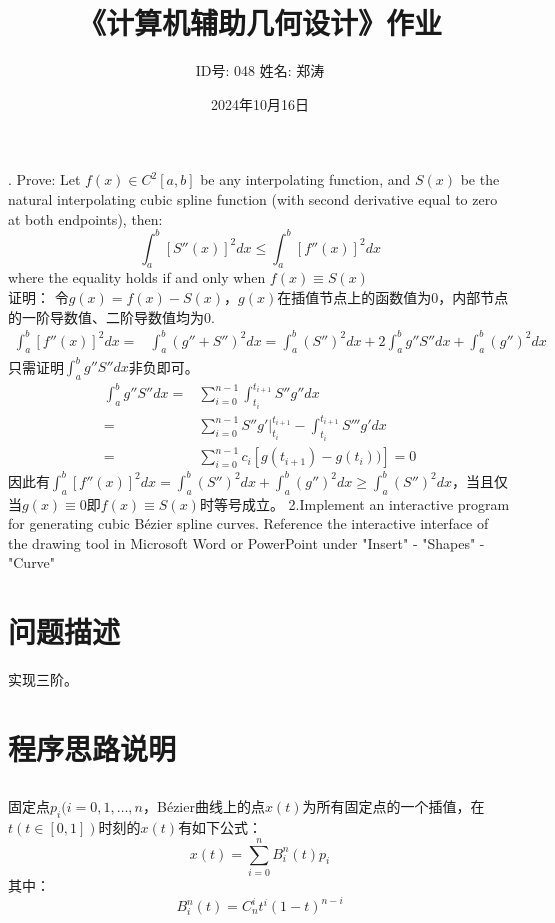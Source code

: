 \documentclass{article}
\newcommand{\Bezier}{B\'ezier}%
\begin{document}
	
	\title{《计算机辅助几何设计》作业}
	\author{ID号: 048  \qquad  姓名: 郑涛}  %
	\date{2024年10月16日}
	\maketitle
	
	. Prove: Let $f(x) \in C^2[a,b]$ be any interpolating function, and $S(x)$ be the natural 
	interpolating cubic spline function (with second derivative equal to zero at both endpoints), then:
	$$\int_{a}^{b}[S''(x)]^2dx\leq\int_{a}^{b}[f''(x)]^2dx$$
	where the equality holds if and only when $f(x) \equiv S(x)$\\
	证明：
	令$g(x)=f(x)-S(x)$，$g(x)$在插值节点上的函数值为0，内部节点的一阶导数值、二阶导数值均为0.
	\begin{equation*}
		\begin{aligned}
			\int_{a}^{b}[f''(x)]^2dx=&\int_{a}^{b}(g''+S'')^2dx=\int_{a}^{b}(S'')^2dx+2\int_{a}^{b}g''S''dx+\int_{a}^{b}(g'')^2dx
		\end{aligned}
	\end{equation*}
只需证明$\int_{a}^{b}g''S''dx$非负即可。
	\begin{equation*}
		\begin{aligned}
			\int_{a}^{b}g''S''dx=&\sum_{i=0}^{n-1}\int_{t_i}^{t_{i+1}}S''g''dx\\
			=&\sum_{i=0}^{n-1}S''g'|_{t_i}^{t_{i+1}}-\int_{t_i}^{t_{i+1}}S'''g'dx\\
			=&\sum_{i=0}^{n-1}c_i[g(t_{i+1})-g(t_i))]=0
		\end{aligned}
	\end{equation*}
因此有$\int_{a}^{b}[f''(x)]^2dx=\int_{a}^{b}(S'')^2dx+\int_{a}^{b}(g'')^2dx\geq\int_{a}^{b}(S'')^2dx$，当且仅当$g(x)\equiv0$即$f(x) \equiv S(x)$时等号成立。
\newpage
\noindent
	2.Implement an interactive program for generating cubic Bézier spline curves. Reference the 
	interactive interface of the drawing tool in Microsoft Word or PowerPoint under "Insert" -
	"Shapes" - "Curve"
\section{问题描述}
	实现三阶。
\section{程序思路说明}
\subsection{}
	固定点$p_{i}(i=0,1,\dots,n$，Bézier曲线上的点$x(t)$为所有固定点的一个插值，在$t(t \in [0,1])$时刻的$x(t)$有如下公式：
	$$x(t) = \sum\limits_{i=0}^{n}B_{i}^{n}(t)p_{i}$$
	其中：
	$$B_{i}^{n}(t)=C_{n}^{i}t^{i}(1-t)^{n-i}$$
\end{document}
